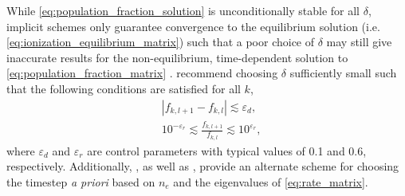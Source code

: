 While \autoref{eq:population_fraction_solution} is unconditionally stable for all $\delta$, implicit schemes only guarantee convergence to the equilibrium solution (i.e. \autoref{eq:ionization_equilibrium_matrix}) such that a poor choice of $\delta$ may still give inaccurate results for the non-equilibrium, time-dependent solution to \autoref{eq:population_fraction_matrix} \citep{bradshaw_numerical_2009}. \citet{macneice_numerical_1984} recommend choosing $\delta$ sufficiently small such that the following conditions are satisfied for all $k$,
\begin{align}
    &|f_{k,l+1} - f_{k,l}| \lesssim \varepsilon_d, \\
    &10^{-\varepsilon_r} \lesssim \frac{f_{k,l+1}}{f_{k,l}} \lesssim 10^{\varepsilon_r},
\end{align}
where $\varepsilon_d$ and $\varepsilon_r$ are control parameters with typical values of 0.1 and 0.6, respectively. Additionally, \citet{masai_x-ray_1984}, as well as \citet{shen_lagrangian_2015}, provide an alternate scheme for choosing the timestep \textit{a priori} based on $n_e$ and the eigenvalues of \autoref{eq:rate_matrix}.
